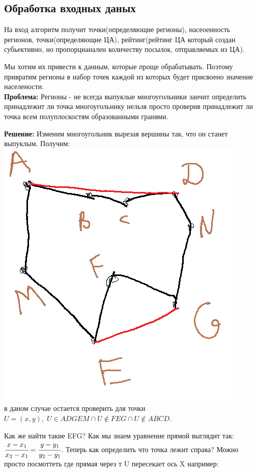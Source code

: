 \documentclass[12pt]{article} %
\begin{document}
 	 \subsection{Обработка входных даных}
 	 \hspace*{1cm}На вход алгоритм получит точки(определяющие регионы), насеоенность регионов, точки(определяющие ЦА), рейтинг(рейтинг ЦА который создан субьективно, но пропорцианален количеству посылок, отправляемых из ЦА).\par
 	 Мы хотим их привести к данным, которые проще обрабатывать. Поэтому привратим регионы в набор точек каждой из которых будет присвоено значение населености.\\
 	 \textbf{Проблема: }Регионы - не всегда выпуклые многоугольники занчит определить принадлежит ли точка многоугольнику нельзя просто проверив принадлежит ли точка всем полуплоскостям образованными гранями. \par
 	 \textbf{Решение: }Изменим многоугольник вырезая вершины так, что он станет выпуклым. Получим: \\
 	 \includegraphics[scale=0.7]{1}\\
 	 в даном случае остается проверить для точки $U = (x, y), \; U \in ADGEM \cap U \notin FEG \cap U \notin ABCD$. \par
 	 Как же найти такие EFG? Как мы знаем уравнение прямой выглядит так: $\cfrac{x-x_1}{x_2 - x_1} = \cfrac{y-y_1}{y_2 -y_1}$. Теперь как определить что точка лежит справа? Можно просто посмоттеть где прямая через т U пересекает ось X например:\\
\end{document}
